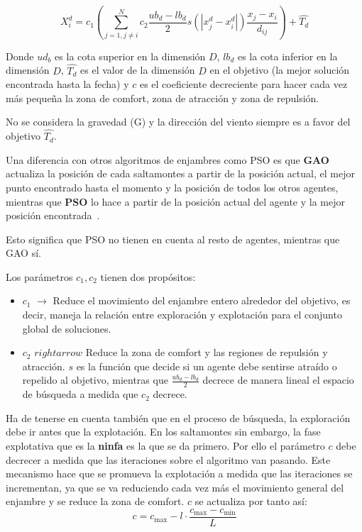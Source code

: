 \begin{equation}
    X_i^d=c_1\left(\sum_{j=1,j\neq i}^N c_2\frac{ub_d-lb_d}{2}s(|x_j^d-x_i^d|)\frac{x_j-x_i}{d_{ij}}\right)+\hat{T_d}
    \label{eq:goa-position}
\end{equation}

Donde $ud_b$ es la cota superior en la dimensión $D$, $lb_d$ es la cota inferior en la dimensión $D$, $\hat{T_d}$ es el valor de la dimensión $D$ en el objetivo (la mejor solución encontrada hasta la fecha) y $c$ es el coeficiente decreciente para hacer cada vez más pequeña la zona de comfort, zona de atracción y zona de repulsión.

No se considera la gravedad (G) y la dirección del viento siempre es a favor del objetivo $\hat{T_d}$.

Una diferencia con otros algoritmos de enjambres como PSO es que \textbf{GAO} actualiza la posición de cada saltamontes a partir de la posición actual, el mejor punto encontrado hasta el momento y la posición de todos los otros agentes, mientras que \textbf{PSO} lo hace a partir de la posición actual del agente y la mejor posición encontrada~\cite{saremi_grasshopper_2017}.

Esto significa que PSO no tienen en cuenta al resto de agentes, mientras que GAO sí.

Los parámetros $c_1, c_2$ tienen dos propósitos:
\begin{itemize}
    \item $c_1$ $\rightarrow$ Reduce el movimiento del enjambre entero alrededor del objetivo, es decir, maneja la relación entre exploración y explotación para el conjunto global de soluciones.
    \item $c_2$ $rightarrow$ Reduce la zona de comfort y las regiones de repulsión y atracción. $s$ es la función que decide si un agente debe sentirse atraído o repelido al objetivo, mientras que $\frac{ub_d-lb_d}{2}$ decrece de manera lineal el espacio de búsqueda a medida que $c_2$ decrece.
\end{itemize}

Ha de tenerse en cuenta también que en el proceso de búsqueda, la exploración debe ir antes que la explotación. En los saltamontes sin embargo, la fase explotativa que es la \textbf{ninfa} es la que se da primero. Por ello el parámetro $c$ debe decrecer a medida que las iteraciones sobre el algoritmo van pasando. Este mecanismo hace que se promueva la explotación a medida que las iteraciones se incrementan, ya que se va reduciendo cada vez más el movimiento general del enjambre y se reduce la zona de comfort. $c$ se actualiza por tanto así:
\begin{equation}
    c = c_{\text{max}} - l \cdot \frac{c_{\text{max}} - c_{\text{min}}}{L}
\end{equation}

